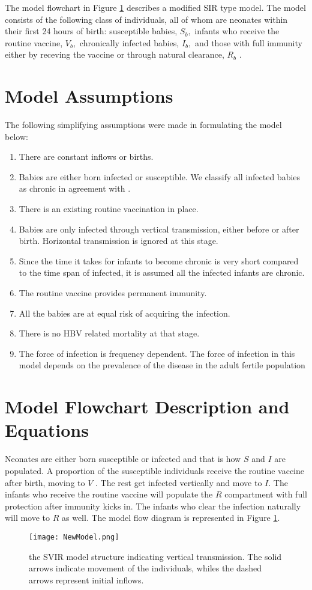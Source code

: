 The model flowchart in Figure \ref{fig:flowchart} describes a modified SIR type model. The model consists of the following class of individuals, all of whom are neonates within their first 24 hours of birth: susceptible babies, $S_b,$ infants who receive the routine vaccine, $V_b,$ chronically infected babies, $I_b, $  and those with full immunity either by receving the vaccine or through natural clearance, $R_b$ .

\section{Model Assumptions}
The following simplifying assumptions were made in formulating the model below:
\begin{enumerate}
	\item There are constant inflows or births. 
	\item Babies are either born infected or susceptible. We classify all infected babies as chronic in agreement with \cite{zhang2012analysisHBVmodel}.
	\item There is an existing routine vaccination in place.
	\item Babies are only infected through vertical transmission, either before or after birth. Horizontal transmission is ignored at this stage.
	\item Since the time it takes for infants to become chronic is very short compared to the time span of infected, it is assumed all the infected infants are chronic.
	\item The routine vaccine provides permanent immunity.
	\item All the babies are at equal risk of acquiring the infection.
	\item There is no HBV related mortality at that stage.
	\item The force of infection is frequency dependent. The force of infection in this model depends on the prevalence of the disease in the adult fertile population
	
\end{enumerate}

\section{Model Flowchart Description and Equations}
Neonates are either born susceptible or infected and that is how $S$ and $I$ are populated. A proportion of the susceptible individuals receive the routine vaccine after birth, moving to $V$ .  The rest get infected vertically and move to $I$. The infants who receive the routine vaccine will populate the $R$ compartment with full protection after immunity kicks in. The infants who clear the infection naturally will move to $R$ as well. 
\clearpage 		
The model flow diagram is represented in Figure \ref{fig:flowchart}. 
\begin{figure}[h!]
	\centering
	\texttt{[image: NewModel.png]}
	\caption{the SVIR model structure indicating vertical transmission. The solid arrows indicate movement of the individuals, whiles the dashed arrows represent initial inflows.} \label{fig:flowchart}
\end{figure}

